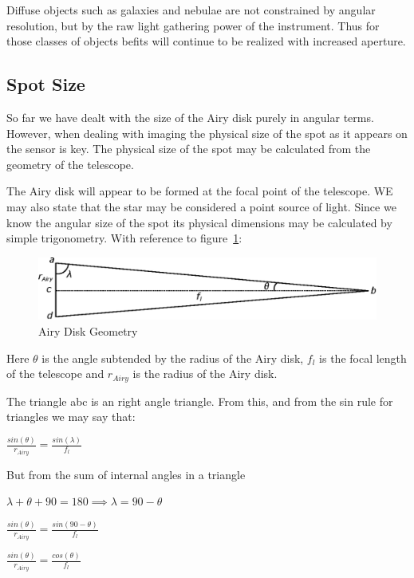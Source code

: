 \documentclass[11pt]{article}
\begin{document}
Diffuse objects such as galaxies and nebulae are not constrained by angular resolution, but by the raw light gathering power of the instrument.  Thus for those classes of objects befits will continue to be realized with increased aperture.   


\subsection{Spot Size}
So far we have dealt with the size of the Airy disk purely in angular terms.  However, when dealing with imaging the physical size of the spot as it appears on the sensor is key.  The physical size of the spot may be calculated from the geometry of the telescope.  

The Airy disk will appear to be formed at the focal point of the telescope. WE may also state that the star may be considered a point source of light.  Since we know the angular size of the spot its physical dimensions may be calculated by simple trigonometry. With reference to figure~\ref{fig:spot_geometry}:


\begin{figure}[htb]
	\begin{center}
		\includegraphics[]{./images/spot_size_figure.eps}
		\caption{Airy Disk Geometry}
		\label{fig:spot_geometry}
	\end{center}
\end{figure}


Here $\theta$ is the angle subtended by the radius of the Airy disk, $f_{l}$ is the focal length of the telescope and $r_{Airy}$ is the radius of the Airy disk.

The triangle abc is an right angle triangle.  From this, and from the sin rule for triangles we may say that:

\LARGE
$\frac{sin(\theta)}{r_{Airy}} = \frac{sin(\lambda)}{f_{l}}$
\large

But from the sum of internal angles in a triangle

$\lambda+\theta+90=180 \implies \lambda=90-\theta$

\LARGE
$\frac{sin(\theta)}{r_{Airy}} = \frac{sin(90-\theta)}{f_{l}}$

\LARGE
$\frac{sin(\theta)}{r_{Airy}} = \frac{cos(\theta)}{f_{l}}$
\end{document}
